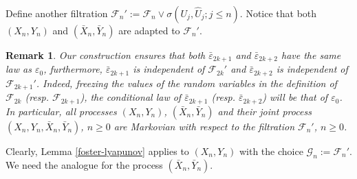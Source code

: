 \documentclass{article}
\newtheorem{remark}[theorem]{Remark}
\begin{document}
Define another filtration
$
\mathcal{F}_n':=\mathcal{F}_n\vee \sigma(U_j,\hat{U}_j;j\leq n). 
$
Notice that both $(X_n,Y_n)$ and $(\bar{X}_n,\bar{Y}_n)$
are adapted to $\mathcal{F}_n'$.


\begin{remark}\label{epsind}
{\rm Our construction ensures that both $\bar\varepsilon_{2k+1}$ and $\bar\varepsilon_{2k+2}$ have the same
law as $\varepsilon_{0}$, furthermore, $\bar\varepsilon_{2k+1}$ is independent of $\mathcal{F}_{2k}'$ and
$\bar\varepsilon_{2k+2}$ is independent of $\mathcal{F}_{2k+1}'$. Indeed, freezing the values of
the random variables in the definition of $\mathcal{F}_{2k}$ (resp. $\mathcal{F}_{2k+1}$), the
conditional law of $\bar\varepsilon_{2k+1}$ (resp. $\bar\varepsilon_{2k+2}$) will be that of $\varepsilon_{0}$.
In particular, 
all processes $(X_{n},Y_{n})$, $(\bar{X}_{n},\bar{Y}_{n})$ and their joint process $(X_{n},Y_{n},\bar{X}_{n},\bar{Y}_{n})$, $n\geq 0$
are Markovian with respect to the filtration $\mathcal{F}_{n}'$, $n\geq 0$.}
\end{remark}

Clearly, Lemma \ref{foster-lyapunov} applies to $(X_{n},Y_{n})$
with the choice $\mathcal{G}_n:=\mathcal{F}_n'$.
We need the analogue for
the process $(\bar{X}_n,\bar{Y}_n)$.
\end{document}

